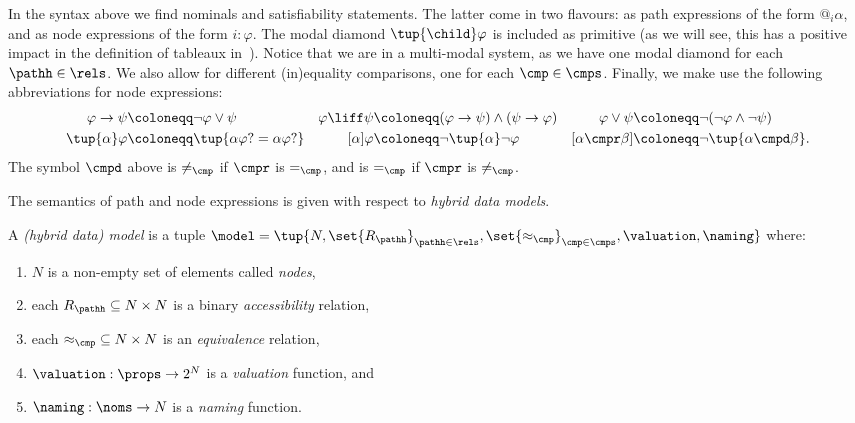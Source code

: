 In the syntax above we find nominals and satisfiability statements. The latter come in two flavours: as path expressions of the form $@_i\alpha$, and as node expressions of the form $i{:}\varphi$. The modal diamond $\tup{\child}\varphi$ is included as primitive (as we will see, this has a positive impact in the definition of tableaux in~).  Notice that we are in a multi-modal system, as we have one modal diamond for each $\pathh\in\rels$. We also allow for different (in)equality comparisons, one for each $\cmp\in\cmps$. 
%
Finally, we make use the following abbreviations for node expressions:
\begin{align*}
  \varphi \to \psi & \coloneqq \lnot\varphi \lor \psi   &
  \varphi \liff \psi & \coloneqq (\varphi \to \psi) \land (\psi \to \varphi) &
  \varphi \lor \psi & \coloneqq \lnot(\lnot\varphi \land \lnot\psi)  \\
  \tup{\alpha}\varphi & \coloneqq \tup{\alpha\varphi? = \alpha\varphi?} &
  [\alpha]\varphi & \coloneqq \lnot\tup{\alpha}\lnot\varphi &
  [\alpha \cmpr \beta] & \coloneqq \lnot\tup{\alpha \cmpd \beta}.
\end{align*}
The symbol ${\cmpd}$ above is ${\neq_\cmp}$ if ${\cmpr}$ is ${=_\cmp}$, and is ${=_\cmp}$ if ${\cmpr}$ is ${\neq_\cmp}$.


The semantics of path and node expressions is given with respect to \emph{hybrid data models}.

\begin{defi}\label{def:models}
  A \emph{(hybrid data) model} is a tuple $\model = \tup{N, \set{R_\pathh}_{\pathh \in \rels}, \set{\approx_{\cmp}}_{\cmp\in\cmps}, \valuation, \naming}$ where:
  \begin{enumerate} 
    \item $N$ is a non-empty set of elements called \emph{nodes}, 
    \item each $R_{\pathh}\subseteq {N\times N}$ is a binary \emph{accessibility} relation,
    \item each ${\approx_{\cmp}} \subseteq {N\times N}$ is an \emph{equivalence} relation, 
    \item $\valuation :\props \to 2^N$  is a \emph{valuation} function, and 
    \item $\naming : \noms \to N$ is a \emph{naming} function.
  \end{enumerate}
\end{defi}

